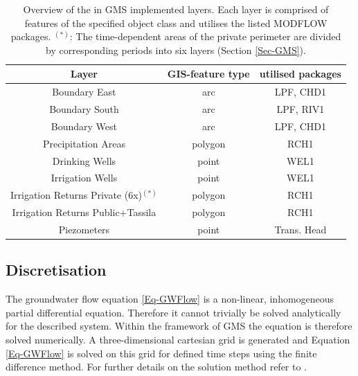\begin{table}[h]
    \centering
    \caption{Overview of the in GMS implemented layers. Each layer is comprised of features of the specified object class and utilises the listed MODFLOW packages. $^{(*)}$: The time-dependent areas of the private perimeter are divided by corresponding periods into six layers (Section \ref{Sec-GMS}).}
    \label{Tab-GMSLayersOV}
    \begin{tabular}{ccc}
        Layer                                   & GIS-feature type & utilised packages \\ \hline
        Boundary East                           & arc              & LPF, CHD1         \\
        Boundary South                          & arc              & LPF, RIV1         \\
        Boundary West                           & arc              & LPF, CHD1         \\
        Precipitation Areas                     & polygon          & RCH1              \\
        Drinking Wells                          & point            & WEL1              \\
        Irrigation Wells                        & point            & WEL1              \\
        Irrigation Returns Private (6x)$^{(*)}$ & polygon          & RCH1              \\
        Irrigation Returns Public+Tassila       & polygon          & RCH1              \\
        Piezometers                             & point            & Trans. Head      
        \end{tabular}
\end{table}


\subsection{Discretisation}
\label{Sec-Discretisation}

The groundwater flow equation \eqref{Eq-GWFlow} is a non-linear, inhomogeneous partial differential equation. 
Therefore it cannot trivially be solved analytically for the described system. 
Within the framework of GMS the equation is therefore solved numerically. 
A three-dimensional cartesian grid is generated and Equation \eqref{Eq-GWFlow} is solved on this grid for defined time steps using the finite difference method. 
For further details on the solution method refer to \textcite{Harbaugh.2000}.

